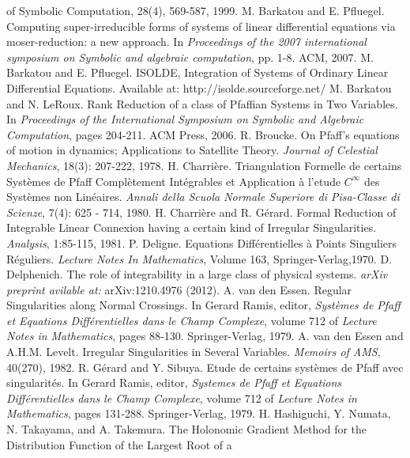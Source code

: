 \documentclass[final,1p,times,number,amsthm]{elsart}
\begin{document}
\begin{thebibliography}{00}
{    of Symbolic Computation}, 28(4), 569-587, 1999.
 M. Barkatou and E. Pfluegel. Computing super-irreducible forms of systems of linear differential equations via moser-reduction: a new approach. In \textit{Proceedings of the 2007 international symposium on Symbolic and algebraic computation}, pp. 1-8. ACM, 2007.
 M. Barkatou and E. Pfluegel. ISOLDE, Integration of Systems of
  Ordinary Linear Differential Equations. Available at:
  http://isolde.sourceforge.net/
 M. Barkatou and N. LeRoux. Rank Reduction of a class of Pfaffian
  Systems in Two Variables. In \textit{Proceedings of the International Symposium
    on Symbolic and Algebraic Computation}, pages 204-211. ACM Press, 2006.
 R. Broucke. On Pfaff's equations of motion in dynamics;
  Applications to Satellite Theory. \textit{Journal of Celestial Mechanics},
  18(3): 207-222, 1978.
 H. Charri\`{e}re. Triangulation Formelle de certains Syst\`{e}mes
  de Pfaff Compl\`{e}tement Int\'{e}grables et Application \`{a} l'etude
  $C^{\infty}$ des Syst\`{e}mes non Lin\'{e}aires. \textit{Annali della Scuola
    Normale Superiore di Pisa-Classe di Scienze}, 7(4): 625 - 714, 1980.
 H. Charri\`ere and R. G\'erard. Formal Reduction of Integrable
  Linear Connexion having a certain kind of Irregular
  Singularities. \textit{Analysis}, 1:85-115, 1981.
 P. Deligne. Equations Diff\'{e}rentielles \`{a} Points
  Singuliers R\'{e}guliers. \textit{Lecture Notes In Mathematics}, Volume 163,
  Springer-Verlag,1970.
     D. Delphenich. The role of integrability in a large class of physical systems. \textit{arXiv preprint avilable at:} arXiv:1210.4976 (2012).
 A. van den Essen. Regular Singularities along Normal
  Crossings. In Gerard Ramis, editor, \textit{Syst\`{e}mes de Pfaff et Equations
    Diff\'{e}rentielles dans le Champ Complexe}, volume 712 of \textit{Lecture Notes
    in Mathematics}, pages 88-130. Springer-Verlag, 1979.
 A. van den Essen and A.H.M. Levelt. Irregular Singularities in
  Several Variables. \textit{Memoirs of AMS}, 40(270), 1982.
 R. G\'{e}rard and Y. Sibuya. Etude de certains syst\`{e}mes de
  Pfaff avec singularit\'{e}s.  In Gerard Ramis, editor, \textit{Systemes de Pfaff
    et Equations Diff\'{e}rentielles dans le Champ Complexe}, volume 712 of
  \textit{Lecture Notes in Mathematics}, pages 131-288. Springer-Verlag, 1979.
 H. Hashiguchi, Y. Numata, N. Takayama, and A. Takemura. The
  Holonomic Gradient Method for the Distribution Function of the Largest Root of a

\end{thebibliography}
\end{document}
